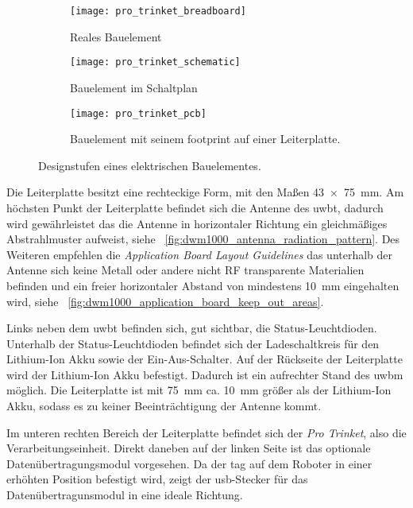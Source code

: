 \begin{figure}
	\begin{subfigure}[t]{0.3\textwidth}
		\centering
		\texttt{[image: pro\_trinket\_breadboard]}
		\caption{Reales Bauelement}
		\label{fig:pro_trinket_breadboard}
	\end{subfigure}
	\quad
	\begin{subfigure}[t]{0.3\textwidth}
		\centering
		\texttt{[image: pro\_trinket\_schematic]}
		\caption{Bauelement im Schaltplan}
		\label{fig:pro_trinket_schematic}
	\end{subfigure}
	\quad
	\begin{subfigure}[t]{0.3\textwidth}
		\centering
		\texttt{[image: pro\_trinket\_pcb]}
		\caption{Bauelement mit seinem \Gls{footprint} auf einer Leiterplatte.}
		\label{fig:pro_trinket_pcb}
	\end{subfigure}
	\caption{Designstufen eines elektrischen Bauelementes.}
	\label{fig:breadboard_schematic_pcb}
\end{figure}

Die Leiterplatte besitzt eine rechteckige Form, mit den Maßen \SI{43 x 75}{\mm}. Am höchsten Punkt der Leiterplatte befindet sich die Antenne des \Gls{uwbt}, dadurch wird gewährleistet das die Antenne in horizontaler Richtung ein gleichmäßiges Abstrahlmuster aufweist, siehe \figurename~\ref{fig:dwm1000_antenna_radiation_pattern}. Des Weiteren empfehlen die \textit{Application Board Layout Guidelines} das unterhalb der Antenne sich keine Metall oder andere nicht RF transparente Materialien befinden und ein freier horizontaler Abstand von mindestens \SI{10}{\mm} eingehalten wird, siehe \figurename~\ref{fig:dwm1000_application_board_keep_out_areas}.

Links neben dem \Gls{uwbt} befinden sich, gut sichtbar, die Status-Leuchtdioden. Unterhalb der Status-Leuchtdioden befindet sich der Ladeschaltkreis für den Lithium-Ion Akku sowie der Ein-Aus-Schalter. Auf der Rückseite der Leiterplatte wird der Lithium-Ion Akku befestigt. Dadurch ist ein aufrechter Stand des \Gls{uwbm} möglich. Die Leiterplatte ist mit \SI{75}{\mm} ca. \SI{10}{\mm} größer als der Lithium-Ion Akku, sodass es zu keiner Beeinträchtigung der Antenne kommt.

Im unteren rechten Bereich der Leiterplatte befindet sich der \textit{Pro Trinket}, also die Verarbeitungseinheit. Direkt daneben auf der linken Seite ist das optionale Datenübertragungsmodul vorgesehen. Da der \Gls{tag} auf dem Roboter in einer erhöhten Position befestigt wird, zeigt der \Gls{usb}-Stecker für das Datenübertragunsmodul in eine ideale Richtung.

